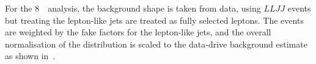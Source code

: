 For the 8~\tev\ analysis, the background shape is taken from data, using $LLJJ$
events but treating the lepton-like jets are treated as fully selected leptons.  The
events are weighted by the fake factors for the lepton-like jets, and the
overall normalisation of the distribution is scaled to the data-drive background
estimate as shown in~.  

